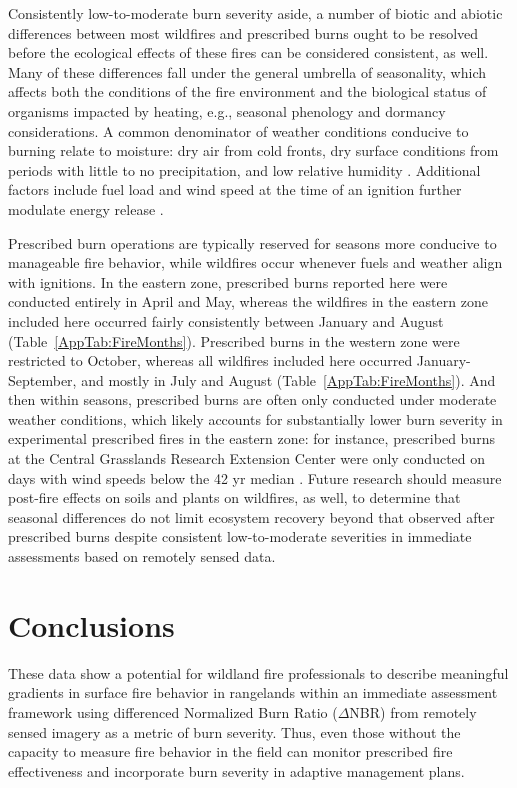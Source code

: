 \documentclass[fire,article,accept,oneauthor,pdftex]{Definitions/mdpi}
\begin{document}
Consistently low-to-moderate burn severity aside, a number of biotic and abiotic differences between most wildfires and prescribed burns ought to be resolved before the ecological effects of these fires can be considered consistent, as well. 
Many of these differences fall under the general umbrella of seasonality, which affects both the conditions of the fire environment and the biological status of organisms impacted by heating, {e.g.}, seasonal phenology and dormancy considerations. 
A common denominator of weather conditions conducive to burning relate to moisture: dry air from cold fronts, dry surface conditions from periods with little to no precipitation, and low relative humidity \cite{flannigan2001}. 
Additional factors include fuel load and wind speed at the time of an ignition further modulate energy release \cite{cheney1995, reid2010, kidnie2015, gomes2020}.

Prescribed burn operations are typically reserved for seasons more conducive to manageable fire behavior, while wildfires occur whenever fuels and weather align with ignitions. 
In the eastern zone, prescribed burns reported here were conducted entirely in April and May, whereas the wildfires in the eastern zone included here occurred fairly consistently between January and August (Table~\ref{AppTab:FireMonths}). 
Prescribed burns in the western zone were restricted to October, whereas all wildfires included here occurred January-September, and mostly in July and August (Table~\ref{AppTab:FireMonths}). 
And then within seasons, prescribed burns are often only conducted under moderate weather conditions, which likely accounts for substantially lower burn severity in experimental prescribed fires in the eastern zone: for instance, prescribed burns at the Central Grasslands Research Extension Center were only conducted on days with wind speeds below the 42 yr median \cite{mcgranahan2025}. 
Future research should measure post-fire effects on soils and plants on wildfires, as well, to determine that seasonal differences do not limit ecosystem recovery beyond that observed after prescribed burns despite consistent low-to-moderate severities in immediate assessments based on remotely sensed data. 

\section{Conclusions} %

These data show a potential for wildland fire professionals to describe meaningful gradients in surface fire behavior in rangelands within an immediate assessment framework using differenced Normalized Burn Ratio ($\Delta$NBR) from remotely sensed imagery as a metric of burn severity. 
Thus, even those without the capacity to measure fire behavior in the field can monitor prescribed fire effectiveness and incorporate burn severity in adaptive management plans. 
\end{document}
